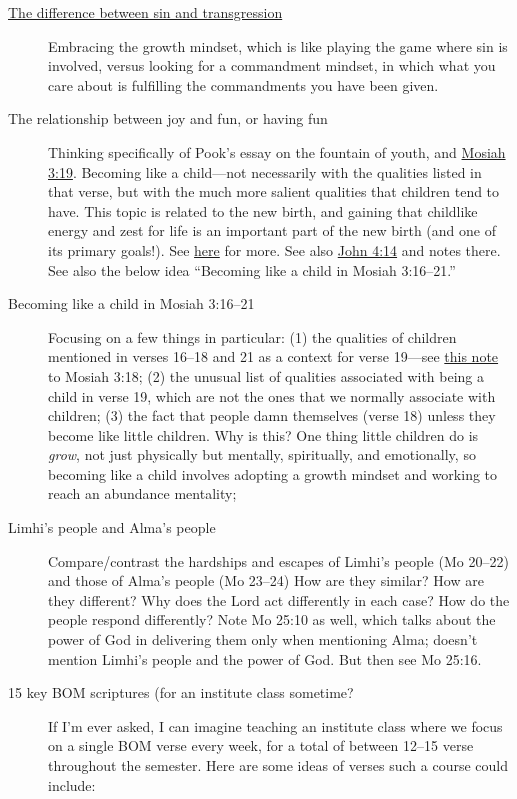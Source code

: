 \begin{description}
		\item[{\hyperref[SIN-sin-transgression]{The difference between sin and transgression}}]
			Embracing the growth mindset, which is like playing the game where sin is involved, versus looking for a commandment mindset, in which what you care about is fulfilling the commandments you have been given.
			
		\item[The relationship between joy and fun, or having fun]
			Thinking specifically of Pook's essay on the fountain of youth, and \hyperref[MOSIAH-3-19]{Mosiah 3:19}. Becoming like a child---not necessarily with the qualities listed in that verse, but with the much more salient qualities that children tend to have. This topic is related to the new birth, and gaining that childlike energy and zest for life is an important part of the new birth (and one of its primary goals!). See \hyperref[NEWBIRTH-child]{here} for more. See also \hyperref[JOHN-4-14]{John 4:14} and notes there. See also the below idea ``Becoming like a child in Mosiah 3:16--21.''
		
		\item[Becoming like a child in Mosiah 3:16--21]
			Focusing on a few things in particular:
				(1) the qualities of children mentioned in verses 16--18 and 21 as a context for verse 19---see \hyperref[MOSIAH-3-18-NOTE-children]{this note} to Mosiah 3:18;
				(2) the unusual list of qualities associated with being a child in verse 19, which are not the ones that we normally associate with children;
				(3) the fact that people damn themselves (verse 18) unless they become like little children. Why is this? One thing little children do is \textit{grow}, not just physically but mentally, spiritually, and emotionally, so becoming like a child involves adopting a growth mindset and working to reach an abundance mentality;
				
		\item[Limhi's people and Alma's people]
			Compare/contrast the hardships and escapes of Limhi's people (Mo 20--22) and those of Alma's people (Mo 23--24)
			How are they similar? How are they different? Why does the Lord act differently in each case? How do the people respond differently? Note Mo 25:10 as well, which talks about the power of God in delivering them only when mentioning Alma; doesn't mention Limhi's people and the power of God. But then see Mo 25:16.
		
		\item[15 key BOM scriptures (for an institute class sometime?]
			If I'm ever asked, I can imagine teaching an institute class where we focus on a single BOM verse every week, for a total of between 12--15 verse throughout the semester. Here are some ideas of verses such a course could include:
			

\end{description}
